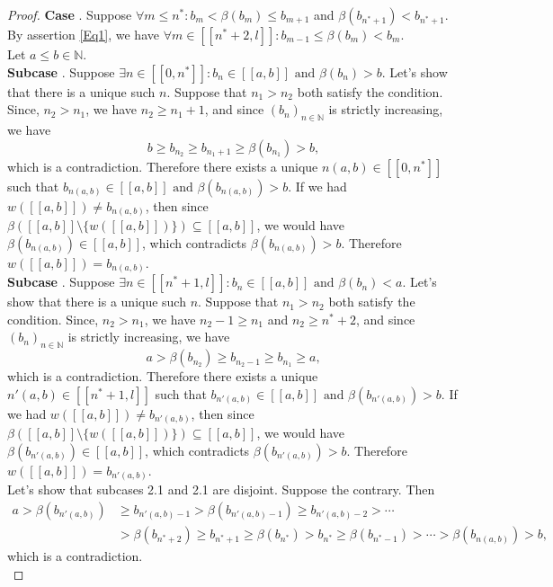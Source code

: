 \documentclass[10pt,a4paper]{amsart}
\newcommand*\circled[1]{\tikz[baseline=(char.base)]{
            \node[shape=circle,draw,inner sep=2pt] (char) {#1};}}
\begin{document}
\begin{proof}
\noindent \textbf{Case \circled{2}}.  Suppose $\forall m \leq n^* : b_m < \beta(b_m) \leq b_{m+1}$ and $\beta(b_{n^*+1}) < b_{n^*+1}$. By assertion \ref{Eq1}, we have $\forall m \in [\![n^*+2,l]\!] : b_{m-1} \leq \beta(b_m) < b_m$. \\
Let $a \leq b \in \mathbb{N}$. \\
\textbf{Subcase \circled{2.1}}. Suppose $\exists n \in [\![0,n^*]\!] : b_n \in [\![a,b]\!] \text{ and } \beta(b_n) > b$. Let's show that there is a unique such $n$. Suppose that $n_1 > n_2$ both satisfy the condition. Since, $n_2 > n_1$, we have $n_2 \geq n_1 + 1$, and since $(b_n)_{n \in \mathbb{N}}$ is strictly increasing, we have 
\[ b \geq b_{n_2} \geq b_{n_1 + 1} \geq \beta(b_{n_1}) > b, \]
which is a contradiction. Therefore there exists a unique $n(a,b) \in [\![0,n^*]\!]$ such that $b_{n(a,b)} \in [\![a,b]\!] \text{ and } \beta(b_{n(a,b)}) > b$. If we had $w([\![a,b]\!]) \neq b_{n(a,b)}$, then since $\beta([\![a,b]\!]\setminus \{w([\![a,b]\!])\}) \subseteq [\![a,b]\!]$, we would have $\beta(b_{n(a,b)}) \in [\![a,b]\!]$, which contradicts $\beta(b_{n(a,b)}) > b$. Therefore $w([\![a,b]\!]) = b_{n(a,b)}$. \\
\textbf{Subcase \circled{2.2}}. Suppose $\exists n \in [\![n^*+1,l]\!] : b_n \in [\![a,b]\!] \text{ and } \beta(b_n) < a $. Let's show that there is a unique such $n$. Suppose that $n_1 > n_2$ both satisfy the condition. Since, $n_2 > n_1$, we have $n_2 -  1 \geq n_1$ and $n_2 \geq n^*+2$, and since $(b_n)_{n \in \mathbb{N}}$ is strictly increasing, we have 
\[ a > \beta(b_{n_2}) \geq b_{n_2 - 1} \geq b_{n_1} \geq a, \]
which is a contradiction. Therefore there exists a unique $n'(a,b) \in [\![n^*+1,l]\!]$ such that $b_{n'(a,b)} \in [\![a,b]\!] \text{ and } \beta(b_{n'(a,b)}) > b$. If we had $w([\![a,b]\!]) \neq b_{n'(a,b)}$, then since $\beta([\![a,b]\!]\setminus \{w([\![a,b]\!])\}) \subseteq [\![a,b]\!]$, we would have $\beta(b_{n'(a,b)}) \in [\![a,b]\!]$, which contradicts $\beta(b_{n'(a,b)}) > b$. Therefore $w([\![a,b]\!]) = b_{n'(a,b)}$. \\
Let's show that subcases 2.1 and 2.1 are disjoint. Suppose the contrary. Then 
\begin{align*}
a > \beta(b_{n'(a,b)}) &\geq b_{n'(a,b)-1}  > \beta(b_{n'(a,b)-1}) \geq b_{n'(a,b)-2} > \cdots  \\
&> \beta(b_{n^*+2}) \geq b_{n^* + 1} \geq \beta(b_{n^*}) > b_{n^*} \geq \beta(b_{n^* - 1}) > \cdots > \beta(b_{n(a,b)}) > b, 
\end{align*}
which is a contradiction. \\

\end{proof}
\end{document}
